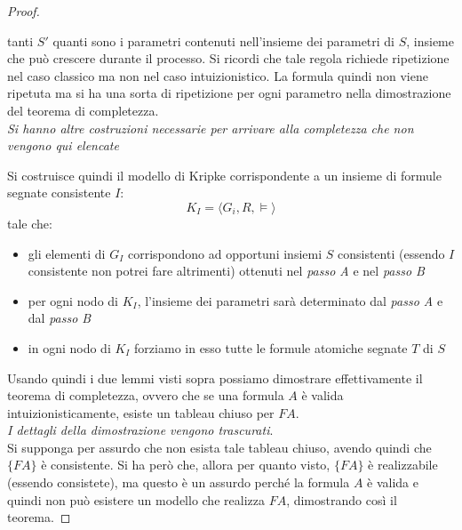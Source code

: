 \documentclass[a4paper,12pt, oneside]{book}
\begin{document}
\begin{proof}
\begin{itemize}
    tanti $S'$ quanti sono i parametri contenuti 
    nell'insieme dei parametri di $S$, insieme che può crescere durante il
    processo. Si ricordi che tale regola richiede ripetizione nel caso classico
    ma non nel caso intuizionistico. La formula quindi non viene ripetuta ma si
    ha una sorta di ripetizione per ogni parametro nella dimostrazione del
    teorema di completezza.\\
    \textit{Si hanno altre costruzioni necessarie per arrivare alla completezza
      che non vengono qui elencate} 
  \end{itemize}
  Si costruisce quindi il modello di Kripke corrispondente a un insieme di
  formule segnate consistente $I$: 
  \[K_I=\langle G_i,R,\vDash\rangle\]
  tale che:
  \begin{itemize}
    \item gli elementi di $G_I$ corrispondono ad opportuni insiemi $S$
    consistenti (essendo $I$ consistente non potrei fare altrimenti)
    ottenuti nel \textit{passo A} e nel \textit{passo B}  
    \item per ogni nodo di $K_I$, l’insieme dei parametri sarà determinato dal
    \textit{passo A} e dal \textit{passo B}   
    \item in ogni nodo di $K_I$ forziamo in esso tutte le formule atomiche
    segnate $T$ di $S$ 
  \end{itemize}
  Usando quindi i due lemmi visti sopra possiamo dimostrare effettivamente
  il teorema di completezza, ovvero che se una formula $A$ è valida
  intuizionisticamente, esiste un tableau chiuso per $FA$.\\
  \textit{I dettagli della dimostrazione vengono trascurati}.  \\
  Si supponga per assurdo che non esista tale tableau chiuso, avendo quindi che
  $\{FA\}$ è consistente. Si ha però che, allora per quanto visto, $\{FA\}$ è
  realizzabile (essendo consistete), ma questo è un assurdo perché la formula
  $A$ è valida e quindi non può esistere un modello che realizza $FA$,
  dimostrando così il teorema. 
\end{proof}
\end{document}
